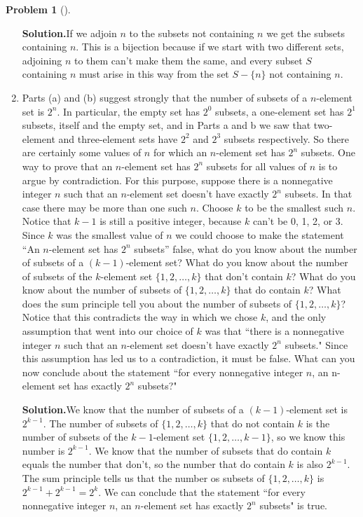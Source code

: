 \documentclass[10pt,]{book}
\theoremstyle{plain}
\theoremstyle{definition}
\newtheorem{activity}[project]{Problem}
\theoremstyle{definition}
\numberwithin{equation}{chapter}
\begin{document}
\begin{activity}[]
\begin{enumerate}[font=\bfseries,label=(\alph*),ref=\alph*]
\par\medskip\noindent%
\textbf{Solution.}\quad If we adjoin \(n\) to the subsets not containing \(n\) we get the subsets containing \(n\). This is a bijection because if we start with two different sets, adjoining \(n\) to them can't make them the same, and every subset \(S\) containing \(n\) must arise in this way from the set \(S-\{n\}\) not containing \(n\).%
\item\label{task-254} Parts (a) and (b) suggest strongly that the number of subsets of a \(n\)-element set is \(2^n\). In particular, the empty set has \(2^0\) subsets, a one-element set has \(2^1\) subsets, itself and the empty set, and in Parts a and b we saw that two-element and three-element sets have \(2^2\) and \(2^3\) subsets respectively. So there are certainly some values of \(n\) for which an \(n\)-element set has \(2^n\) subsets. One way to prove that an \(n\)-element set has \(2^n\) subsets for all values of \(n\) is to argue by contradiction. For this purpose, suppose there is a nonnegative integer \(n\) such that an \(n\)-element set doesn't have exactly \(2^n\) subsets. In that case there may be more than one such \(n\). Choose \(k\) to be the smallest such \(n\). Notice that \(k -1\) is still a positive integer, because \(k\) can't be 0, 1, 2, or 3. Since \(k\) was the smallest value of \(n\) we could choose to make the statement ``An \(n\)-element set has \(2^n\) subsets'' false, what do you know about the number of subsets of a \((k - 1)\)-element set? What do you know about the number of subsets of the \(k\)-element set \(\{1, 2, \ldots, k \}\) that don't contain \(k\)? What do you know about the number of subsets of \(\{1,
2, \ldots,  k \}\) that do contain \(k\)? What does the sum principle tell you about the number of subsets of \(\{1, 2, \ldots, k \}\)? Notice that this contradicts the way in which we chose \(k\), and the only assumption that went into our choice of \(k\) was that ``there is a nonnegative integer \(n\) such that an \(n\)-element set doesn't have exactly \(2^n\) subsets." Since this assumption has led us to a contradiction, it must be false. What can you now conclude about the statement ``for every nonnegative integer \(n\), an n-element set has exactly \(2^n\) subsets?"%
\par\medskip\noindent%
\textbf{Solution.}\quad We know that the number of subsets of a \((k-1)\)-element set is \(2^{k-1}\). The number of subsets of \(\{1,2,\ldots,k\}\) that do not contain \(k\) is the number of subsets of the \(k-1\)-element set \(\{1,2,\ldots,
k-1\}\), so we know this number is \(2^{k-1}\). We know that the number of subsets that do contain \(k\) equals the number that don't, so the number that do contain \(k\) is also \(2^{k-1}\). The sum principle tells us that the number os subsets of \(\{1,2,\ldots, k\}\) is \(2^{k-1}+2^{k-1}=2^k\). We can conclude that the statement ``for every nonnegative integer \(n\), an \(n\)-element set has exactly \(2^n\) subsets" is true.%
\end{enumerate}
\end{activity}
\end{document}
